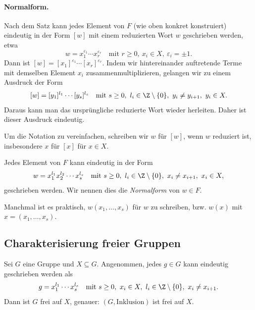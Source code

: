 \documentclass[11pt]{article}
\begin{document}
\paragraph{Normalform.}
Nach dem Satz kann jedes Element von $F$ (wie oben konkret konstruiert) eindeutig in der Form $[w]$ mit einem reduzierten Wort $w$ geschrieben werden, etwa
\[ w = x_1^{\varepsilon_1} \cdots x_r^{\varepsilon_r} \quad \text{mit } r \ge 0,\ x_i \in X,\ \varepsilon_i = \pm 1. \]
Dann ist $[w] = [x_1]^{\varepsilon_1} \cdots [x_r]^{\varepsilon_r}$. Indem wir hintereinander auftretende Terme mit demselben Element $x_i$ zusammenmultiplizieren, gelangen wir zu einem Ausdruck der Form
\[ [w] = [y_1]^{l_1} \cdots [y_s]^{l_s} \quad \text{mit } s \ge 0,\ l_i \in \Z \setminus \{0\},\ y_i \neq y_{i+1},\ y_i \in X. \]
Daraus kann man das ursprüngliche reduzierte Wort wieder herleiten. Daher ist dieser Ausdruck eindeutig.

Um die Notation zu vereinfachen, schreiben wir $w$ für $[w]$, wenn $w$ reduziert ist, insbesondere $x$ für $[x]$ für $x \in X$.

\begin{corollary}\Theorem
  Jedes Element von $F$ kann eindeutig in der Form
  \[ w = x_1^{l_1} x_2^{l_2} \cdots x_s^{l_s} \quad \text{mit } s \ge 0,\ l_i \in \Z \setminus \{0\},\ x_i \neq x_{i+1},\ x_i \in X, \]
  geschrieben werden. Wir nennen dies die \emph{Normalform} von $w \in F$.
\end{corollary}


Manchmal ist es praktisch, $w(x_1, \dots, x_s)$ für $w$ zu schreiben, bzw. $w(x)$ mit $x = (x_1, \dots, x_s)$.




\subsection{Charakterisierung freier Gruppen}

\begin{theorem}[Normalform]\Theorem
  Sei $G$ eine Gruppe und $X \subseteq G$. Angenommen, jedes $g \in G$ kann eindeutig geschrieben werden als
  \[ g = x_1^{l_1} \cdots x_s^{l_s} \quad \text{mit } s \ge 0,\ x_i \in X,\ l_i \in \Z \setminus \{0\},\ x_i \neq x_{i+1}. \]
  Dann ist $G$ frei auf $X$, genauer: $(G, \text{Inklusion})$ ist frei auf $X$.
\end{theorem}
\end{document}
